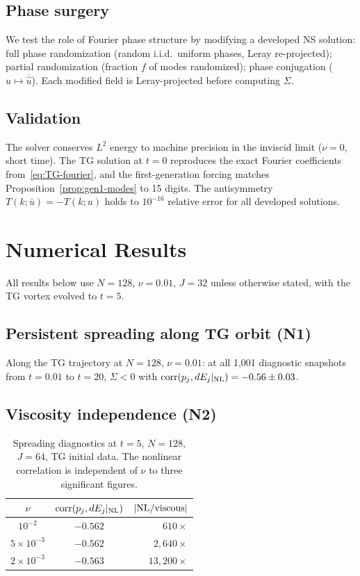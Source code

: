 \documentclass[11pt]{article}
\theoremstyle{definition}
\DeclareMathOperator{\corr}{corr}
\begin{document}
\subsection{Phase surgery}

We test the role of Fourier phase structure by modifying
a developed NS solution:
full phase randomization (random i.i.d.\ uniform
phases, Leray re-projected);
partial randomization (fraction $f$ of modes
randomized);
phase conjugation ($\hat u\mapsto\overline{\hat u}$).
Each modified field is Leray-projected before computing
$\Sigma$.

\subsection{Validation}

The solver conserves $L^2$ energy to machine precision
in the inviscid limit ($\nu=0$, short time).  The TG
solution at $t=0$ reproduces the exact Fourier coefficients
from~\eqref{eq:TG-fourier}, and the first-generation
forcing matches Proposition~\ref{prop:gen1-modes} to 15
digits.  The antisymmetry $T(k;\bar u)=-T(k;u)$ holds to
$10^{-16}$ relative error for all developed solutions.

\section{Numerical Results}
\label{sec:results}

All results below use $N=128$, $\nu=0.01$, $J=32$
unless otherwise stated, with the TG vortex evolved to
$t=5$.

\subsection{Persistent spreading along TG orbit (N1)}

Along the TG trajectory at $N=128$, $\nu=0.01$:
at all 1{,}001 diagnostic snapshots from $t=0.01$ to
$t=20$, $\Sigma < 0$ with
$\corr(p_j,dE_j|_{\rm NL}) = -0.56\pm 0.03$.

\subsection{Viscosity independence (N2)}

\begin{table}[h]
\centering
\caption{Spreading diagnostics at $t=5$, $N=128$, $J=64$,
TG initial data.  The nonlinear correlation is independent
of $\nu$ to three significant figures.}
\label{tab:nu}
\begin{tabular}{@{}ccr@{}}
\toprule
$\nu$ & $\corr(p_j,dE_j|_{\rm NL})$
  & $|{\rm NL}/{\rm viscous}|$ \\
\midrule
$10^{-2}$          & $-0.562$ & $610\times$ \\
$5\times 10^{-3}$  & $-0.562$ & $2{,}640\times$ \\
$2\times 10^{-3}$  & $-0.563$ & $13{,}200\times$ \\
\bottomrule
\end{tabular}
\end{table}
\end{document}
